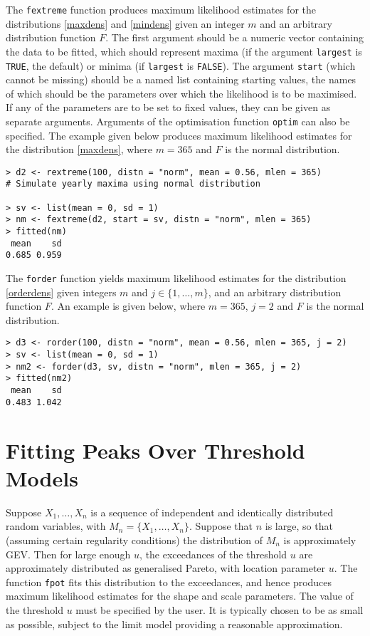 \documentclass[11pt,a4paper]{article}
\begin{document}
The \verb+fextreme+ function produces maximum likelihood estimates for the distributions \eqref{maxdens} and \eqref{mindens} given an integer $m$ and an arbitrary distribution function $F$.
The first argument should be a numeric vector containing the data to be fitted, which should represent maxima (if the argument \verb+largest+ is \verb+TRUE+, the default) or minima (if \verb+largest+ is \verb+FALSE+).
The argument \verb+start+ (which cannot be missing) should be a named list containing starting values, the names of which should be the parameters over which the likelihood is to be maximised.
If any of the parameters are to be set to fixed values, they can be given as separate arguments.
Arguments of the optimisation function \verb+optim+ can also be specified.
The example given below produces maximum likelihood estimates for the distribution \eqref{maxdens}, where $m = 365$ and $F$ is the normal distribution.

\begin{verbatim}
> d2 <- rextreme(100, distn = "norm", mean = 0.56, mlen = 365)
# Simulate yearly maxima using normal distribution
 
> sv <- list(mean = 0, sd = 1)
> nm <- fextreme(d2, start = sv, distn = "norm", mlen = 365)
> fitted(nm)
 mean    sd
0.685 0.959
\end{verbatim}

The \verb+forder+ function yields maximum likelihood estimates for the distribution \eqref{orderdens} given integers $m$ and $j \in \{1,\dots,m\}$, and an arbitrary distribution function $F$.
An example is given below, where $m = 365$, $j = 2$ and $F$ is the normal distribution.
\begin{verbatim}
> d3 <- rorder(100, distn = "norm", mean = 0.56, mlen = 365, j = 2)
> sv <- list(mean = 0, sd = 1) 
> nm2 <- forder(d3, sv, distn = "norm", mlen = 365, j = 2)
> fitted(nm2)
 mean    sd 
0.483 1.042 
\end{verbatim}


\section{Fitting Peaks Over Threshold Models}
\setcounter{footnote}{0}
\label{potfit}

Suppose $X_1,\dots,X_n$ is a sequence of independent and identically distributed random variables, with $M_n = \{X_1,\dots,X_n\}$. Suppose that $n$ is large, so that (assuming certain regularity conditions) the distribution of $M_n$ is approximately GEV\@. Then for large enough $u$, the exceedances of the threshold $u$ are approximately distributed as generalised Pareto, with location parameter $u$. The function \verb+fpot+ fits this distribution to the exceedances, and hence produces maximum likelihood estimates for the shape and scale parameters. The value of the threshold $u$ must be specified by the user. It is typically chosen to be as small as possible, subject to the limit model providing a reasonable approximation. 
\end{document}
